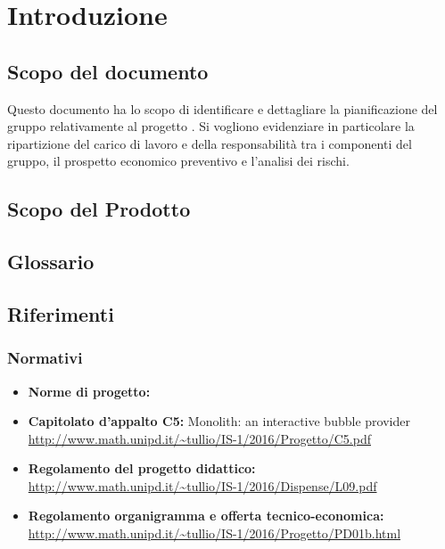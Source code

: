 \section{Introduzione}

\subsection{Scopo del documento}
Questo documento ha lo scopo di identificare e dettagliare la pianificazione del gruppo \GroupName{} relativamente al progetto \ProjectName{}. Si vogliono evidenziare in particolare la ripartizione del carico di lavoro e della responsabilità tra i componenti del gruppo, il prospetto economico preventivo e l'analisi dei rischi.

\subsection{Scopo del Prodotto}
\ScopoDelProdotto

\subsection{Glossario}
\GlossarioIntroduzione

\subsection{Riferimenti}
\subsubsection{Normativi}
\begin{itemize}
\item \textbf{Norme di progetto:} \NormeDiProgetto{}
\item\textbf{ Capitolato d'appalto C5:} Monolith: an interactive bubble provider \\ \url{http://www.math.unipd.it/~tullio/IS-1/2016/Progetto/C5.pdf}
\item \textbf{Regolamento del progetto didattico:} \\ \url{http://www.math.unipd.it/~tullio/IS-1/2016/Dispense/L09.pdf}
\item \textbf{Regolamento organigramma e offerta tecnico-economica:} \\ \url{http://www.math.unipd.it/~tullio/IS-1/2016/Progetto/PD01b.html}
\end{itemize}


